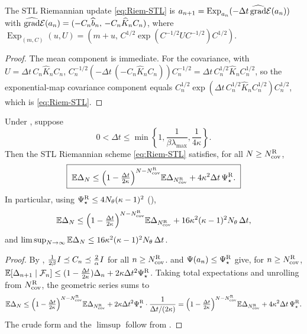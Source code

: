 \begin{proposition}
\label{prop:upd-map-Riem-import}
The STL Riemannian update \eqref{eq:Riem-STL} is
$a_{n+1}=\operatorname{Exp}_{a_n}(-\Delta t\,\widehat\grad\calE(a_n))$ with
$\widehat\grad\calE(a_n)=(-C_n\widehat b_n,\,-C_n\widehat K_nC_n)$, where
$\operatorname{Exp}_{(m,C)}(u,U)=(m+u,\,C^{1/2}\exp(C^{-1/2}UC^{-1/2})C^{1/2})$.
\end{proposition}

\begin{proof}
The mean component is immediate. For the covariance, with $U=\Delta t\,C_n\widehat K_nC_n$,
$C_n^{-1/2}(-\Delta t\,(-C_n\widehat K_nC_n))C_n^{-1/2}=\Delta t\,C_n^{1/2}\widehat K_nC_n^{1/2}$, so the
exponential-map covariance component equals
$C_n^{1/2}\exp(\Delta t\,C_n^{1/2}\widehat K_nC_n^{1/2})C_n^{1/2}$, which is \eqref{eq:Riem-STL}.
\end{proof}

\begin{theorem}
\label{thm:Riem-STL-global}
Under , suppose
\[
    0<\Delta t\leq\min\left\{1,\frac1{\beta\lambda_{\max}},\frac1{4\kappa}\right\}.
\]
Then the STL Riemannian scheme \eqref{eq:Riem-STL} satisfies, for all $N\geq N_{\cov}^{\Riem}$,
\[
    \boxed{\;
    \E\Delta_N
    \leq
    \Bigl(1-\tfrac{\Delta t}{2\kappa}\Bigr)^{N-N_{\cov}^{\Riem}}\E\Delta_{N_{\cov}^{\Riem}}
    +
    4\kappa^2\Delta t\,\Psi_\star^{\Riem}.
    \;}
\]
In particular, using $\Psi_\star^{\Riem}\leq4N_\theta(\kappa-1)^2$ (),
\[
    \E\Delta_N
    \leq
    \Bigl(1-\tfrac{\Delta t}{2\kappa}\Bigr)^{N-N_{\cov}^{\Riem}}\E\Delta_{N_{\cov}^{\Riem}}
    +
    16\kappa^2(\kappa-1)^2N_\theta\,\Delta t,
\]
and $\limsup_{N\to\infty}\E\Delta_N\leq16\kappa^2(\kappa-1)^2N_\theta\,\Delta t$.
\end{theorem}

\begin{proof}
By , $\tfrac1{2\beta}\Id\preceq C_n\preceq\tfrac2\alpha\Id$ for
all $n\geq N_{\cov}^{\Riem}$.  and $\Psi(a_n)\leq\Psi_\star^{\Riem}$
give, for $n\geq N_{\cov}^{\Riem}$,
$\E[\Delta_{n+1}\mid\Fil_n]\leq(1-\tfrac{\Delta t}{2\kappa})\Delta_n+2\kappa\Delta t^2\Psi_\star^{\Riem}$.
Taking total expectations and unrolling from $N_{\cov}^{\Riem}$, the geometric series sums to
\[
    \E\Delta_N
    \leq
    \Bigl(1-\tfrac{\Delta t}{2\kappa}\Bigr)^{N-N_{\cov}^{\Riem}}\E\Delta_{N_{\cov}^{\Riem}}
    +
    2\kappa\Delta t^2\Psi_\star^{\Riem}\cdot\frac{1}{\Delta t/(2\kappa)}
    =
    \Bigl(1-\tfrac{\Delta t}{2\kappa}\Bigr)^{N-N_{\cov}^{\Riem}}\E\Delta_{N_{\cov}^{\Riem}}
    +
    4\kappa^2\Delta t\,\Psi_\star^{\Riem}.
\]
The crude form and the $\limsup$ follow from .
\end{proof}

